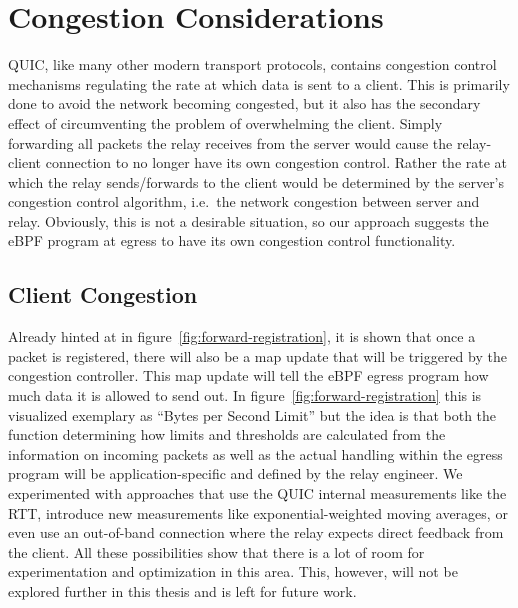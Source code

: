 \section{Congestion Considerations}\label{sec:congestion_considerations}
QUIC, like many other modern transport protocols, contains congestion 
control mechanisms regulating the rate at which data is sent to a client.
This is primarily done to avoid the network becoming congested, but it also
has the secondary effect of circumventing the problem of overwhelming the client.
Simply forwarding all packets the relay receives from the server would cause 
the relay-client connection to no longer have its own congestion control.
Rather the rate at which the relay sends/forwards to the client would be determined
by the server's congestion control algorithm, i.e.~the network congestion between 
server and relay.
Obviously, this is not a desirable situation, so our approach suggests the eBPF 
program at egress to have its own congestion control functionality.

\subsection{Client Congestion}
Already hinted at in figure~\ref{fig:forward-registration}, it is shown that once a packet is 
registered, there will also be a map update that will be triggered by the congestion controller.
This map update will tell the eBPF egress program how much data it is allowed to send out. 
In figure~\ref{fig:forward-registration} this is visualized exemplary as ``Bytes per Second Limit''
but the idea is that both the function determining how limits and thresholds are calculated from 
the information on incoming packets as well as the actual handling within the egress program 
will be application-specific and defined by the relay engineer.
We experimented with approaches that use the QUIC internal measurements like the RTT, 
introduce new measurements like exponential-weighted moving averages, or even use an 
out-of-band connection where the relay expects direct feedback from the client.
All these possibilities show that there is a lot of room for experimentation and optimization
in this area.
This, however, will not be explored further in this thesis and is left for future work.
\\

